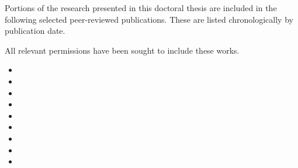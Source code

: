 
\begin{preamble}

Portions of the research presented in this doctoral thesis are included in the following selected peer-reviewed publications. These are listed chronologically by publication date.

All relevant permissions have been sought to include these works.

\begin{itemize}
    \item{}
    \item{}
    \item{}
    \item{}
    \item{}
    \item{}
    \item{}
    \item{}
    \item{}
\end{itemize}

%

\end{preamble}

\newpage
\thispagestyle{empty}
\mbox{}
\newpage
\thispagestyle{empty}
\mbox{}
\newpage
